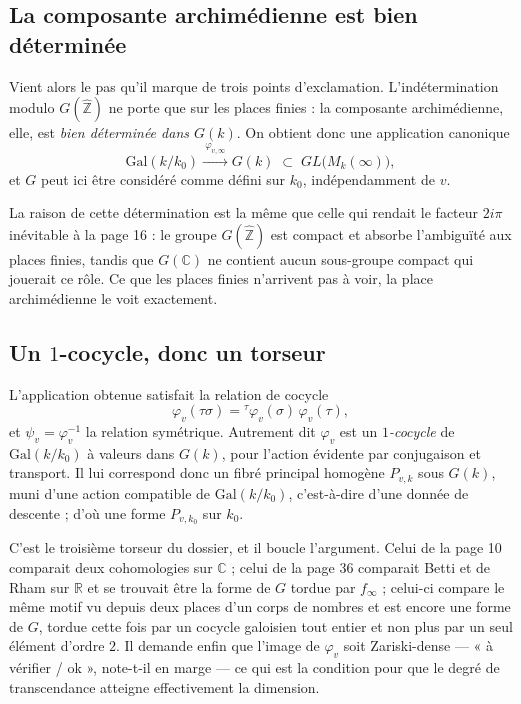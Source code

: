 \documentclass[11pt,a4paper]{article}
\begin{document}
\subsection*{La composante archimédienne est bien déterminée}

Vient alors le pas qu'il marque de trois points d'exclamation. L'indétermination
modulo $G(\widehat{\mathbb{Z}})$ ne porte que sur les places finies : la
composante archimédienne, elle, est \emph{bien déterminée dans $G(k)$}. On
obtient donc une application canonique
\[
  \mathrm{Gal}(k/k_{0}) \xrightarrow{\ \varphi_{v,\infty}\ } G(k)
  \;\subset\; GL\bigl(M_{k}(\infty)\bigr) ,
\]
et $G$ peut ici être considéré comme défini sur $k_{0}$, indépendamment de $v$.

La raison de cette détermination est la même que celle qui rendait le facteur
$2i\pi$ inévitable à la page 16 : le groupe $G(\widehat{\mathbb{Z}})$ est compact
et absorbe l'ambiguïté aux places finies, tandis que $G(\mathbb{C})$ ne contient
aucun sous-groupe compact qui jouerait ce rôle. Ce que les places finies
n'arrivent pas à voir, la place archimédienne le voit exactement.

\subsection*{Un $1$-cocycle, donc un torseur}

L'application obtenue satisfait la relation de cocycle
\[
  \varphi_{v}(\tau\sigma) = {}^{\tau}\varphi_{v}(\sigma)\, \varphi_{v}(\tau) ,
\]
et $\psi_{v} = \varphi_{v}^{-1}$ la relation symétrique. Autrement dit
$\varphi_{v}$ est un \emph{$1$-cocycle} de $\mathrm{Gal}(k/k_{0})$ à valeurs
dans $G(k)$, pour l'action évidente par conjugaison et transport. Il lui
correspond donc un fibré principal homogène $P_{v,k}$ sous $G(k)$, muni d'une
action compatible de $\mathrm{Gal}(k/k_{0})$, c'est-à-dire d'une donnée de
descente ; d'où une forme $P_{v,k_{0}}$ sur $k_{0}$.

C'est le troisième torseur du dossier, et il boucle l'argument. Celui de la
page 10 comparait deux cohomologies sur $\mathbb{C}$ ; celui de la page 36
comparait Betti et de Rham sur $\mathbb{R}$ et se trouvait être la forme de $G$
tordue par $f_{\infty}$ ; celui-ci compare le même motif vu depuis deux places
d'un corps de nombres et est encore une forme de $G$, tordue cette fois par un
cocycle galoisien tout entier et non plus par un seul élément d'ordre $2$. Il
demande enfin que l'image de $\varphi_{v}$ soit Zariski-dense — « à vérifier /
ok », note-t-il en marge — ce qui est la condition pour que le degré de
transcendance atteigne effectivement la dimension.
\end{document}
